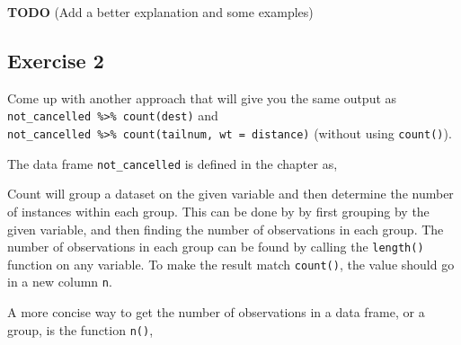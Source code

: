 \documentclass[]{book}
\newenvironment{Shaded}{\begin{snugshade}}{\end{snugshade}}
\newcommand{\CommentTok}[1]{\textcolor[rgb]{0.56,0.35,0.01}{\textit{#1}}}
\newcommand{\DataTypeTok}[1]{\textcolor[rgb]{0.13,0.29,0.53}{#1}}
\newcommand{\KeywordTok}[1]{\textcolor[rgb]{0.13,0.29,0.53}{\textbf{#1}}}
\newcommand{\NormalTok}[1]{#1}
\newcommand{\OperatorTok}[1]{\textcolor[rgb]{0.81,0.36,0.00}{\textbf{#1}}}
\newcommand{\StringTok}[1]{\textcolor[rgb]{0.31,0.60,0.02}{#1}}
\theoremstyle{plain}
\theoremstyle{remark}
\theoremstyle{definition}
\theoremstyle{definition}
\theoremstyle{definition}
\theoremstyle{remark}
\begin{document}
\textbf{TODO} (Add a better explanation and some examples)

\hypertarget{exercise-2-9}{%
\subsection{Exercise 2}\label{exercise-2-9}}

Come up with another approach that will give you the same output as
\texttt{not\_cancelled\ \%\textgreater{}\%\ count(dest)} and
\texttt{not\_cancelled\ \%\textgreater{}\%\ count(tailnum,\ wt\ =\ distance)}
(without using \texttt{count()}).

The data frame \texttt{not\_cancelled} is defined in the chapter as,

\begin{Shaded}
\end{Shaded}

Count will group a dataset on the given variable and then determine the
number of instances within each group. This can be done by by first
grouping by the given variable, and then finding the number of
observations in each group. The number of observations in each group can
be found by calling the \texttt{length()} function on any variable. To
make the result match \texttt{count()}, the value should go in a new
column \texttt{n}.

\begin{Shaded}
\end{Shaded}

A more concise way to get the number of observations in a data frame, or
a group, is the function \texttt{n()},
\end{document}
